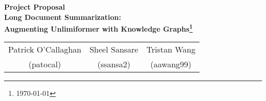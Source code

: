 \begin{center}
\large
\textbf{Project Proposal}\\
\Large
\textbf{Long Document Summarization:}\\
\textbf{Augmenting Unlimiformer with Knowledge Graphs\footnote{\today}}\\
\begin{table}[h]
    \centering
    \begin{tabular}{ccc}
        Patrick O'Callaghan&  Sheel Sansare& Tristan Wang\\
         (patocal)& (ssansa2)  & (aawang99)\\
    \end{tabular}
    \label{tab:my_label}
\end{table}
\end{center}
